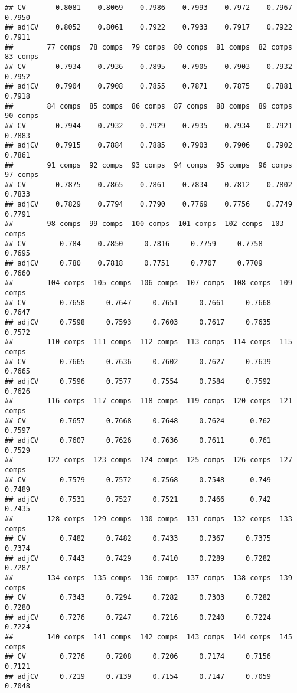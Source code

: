 \documentclass[
]{article}
\begin{document}
\begin{verbatim}
## CV       0.8081    0.8069    0.7986    0.7993    0.7972    0.7967    0.7950
## adjCV    0.8052    0.8061    0.7922    0.7933    0.7917    0.7922    0.7911
##        77 comps  78 comps  79 comps  80 comps  81 comps  82 comps  83 comps
## CV       0.7934    0.7936    0.7895    0.7905    0.7903    0.7932    0.7952
## adjCV    0.7904    0.7908    0.7855    0.7871    0.7875    0.7881    0.7918
##        84 comps  85 comps  86 comps  87 comps  88 comps  89 comps  90 comps
## CV       0.7944    0.7932    0.7929    0.7935    0.7934    0.7921    0.7883
## adjCV    0.7915    0.7884    0.7885    0.7903    0.7906    0.7902    0.7861
##        91 comps  92 comps  93 comps  94 comps  95 comps  96 comps  97 comps
## CV       0.7875    0.7865    0.7861    0.7834    0.7812    0.7802    0.7833
## adjCV    0.7829    0.7794    0.7790    0.7769    0.7756    0.7749    0.7791
##        98 comps  99 comps  100 comps  101 comps  102 comps  103 comps
## CV        0.784    0.7850     0.7816     0.7759     0.7758     0.7695
## adjCV     0.780    0.7818     0.7751     0.7707     0.7709     0.7660
##        104 comps  105 comps  106 comps  107 comps  108 comps  109 comps
## CV        0.7658     0.7647     0.7651     0.7661     0.7668     0.7647
## adjCV     0.7598     0.7593     0.7603     0.7617     0.7635     0.7572
##        110 comps  111 comps  112 comps  113 comps  114 comps  115 comps
## CV        0.7665     0.7636     0.7602     0.7627     0.7639     0.7665
## adjCV     0.7596     0.7577     0.7554     0.7584     0.7592     0.7626
##        116 comps  117 comps  118 comps  119 comps  120 comps  121 comps
## CV        0.7657     0.7668     0.7648     0.7624      0.762     0.7597
## adjCV     0.7607     0.7626     0.7636     0.7611      0.761     0.7529
##        122 comps  123 comps  124 comps  125 comps  126 comps  127 comps
## CV        0.7579     0.7572     0.7568     0.7548      0.749     0.7489
## adjCV     0.7531     0.7527     0.7521     0.7466      0.742     0.7435
##        128 comps  129 comps  130 comps  131 comps  132 comps  133 comps
## CV        0.7482     0.7482     0.7433     0.7367     0.7375     0.7374
## adjCV     0.7443     0.7429     0.7410     0.7289     0.7282     0.7287
##        134 comps  135 comps  136 comps  137 comps  138 comps  139 comps
## CV        0.7343     0.7294     0.7282     0.7303     0.7282     0.7280
## adjCV     0.7276     0.7247     0.7216     0.7240     0.7224     0.7224
##        140 comps  141 comps  142 comps  143 comps  144 comps  145 comps
## CV        0.7276     0.7208     0.7206     0.7174     0.7156     0.7121
## adjCV     0.7219     0.7139     0.7154     0.7147     0.7059     0.7048

\end{verbatim}
\end{document}
